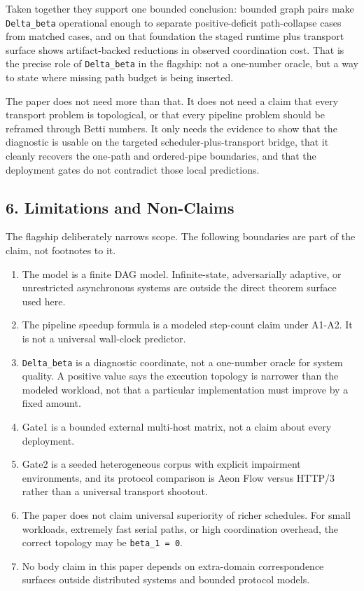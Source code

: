 \documentclass[
  11pt,
]{article}
\providecommand{\tightlist}{%
  \setlength{\itemsep}{0pt}\setlength{\parskip}{0pt}}
\begin{document}
Taken together they support one bounded conclusion: bounded graph pairs
make \texttt{Delta\_beta} operational enough to separate
positive-deficit path-collapse cases from matched cases, and on that
foundation the staged runtime plus transport surface shows
artifact-backed reductions in observed coordination cost. That is the
precise role of \texttt{Delta\_beta} in the flagship: not a one-number
oracle, but a way to state where missing path budget is being inserted.

The paper does not need more than that. It does not need a claim that
every transport problem is topological, or that every pipeline problem
should be reframed through Betti numbers. It only needs the evidence to
show that the diagnostic is usable on the targeted
scheduler-plus-transport bridge, that it cleanly recovers the one-path
and ordered-pipe boundaries, and that the deployment gates do not
contradict those local predictions.

\subsection{6. Limitations and
Non-Claims}\label{limitations-and-non-claims}

The flagship deliberately narrows scope. The following boundaries are
part of the claim, not footnotes to it.

\begin{enumerate}
\def\labelenumi{\arabic{enumi}.}
\tightlist
\item
  The model is a finite DAG model. Infinite-state, adversarially
  adaptive, or unrestricted asynchronous systems are outside the direct
  theorem surface used here.
\item
  The pipeline speedup formula is a modeled step-count claim under
  A1-A2. It is not a universal wall-clock predictor.
\item
  \texttt{Delta\_beta} is a diagnostic coordinate, not a one-number
  oracle for system quality. A positive value says the execution
  topology is narrower than the modeled workload, not that a particular
  implementation must improve by a fixed amount.
\item
  Gate1 is a bounded external multi-host matrix, not a claim about every
  deployment.
\item
  Gate2 is a seeded heterogeneous corpus with explicit impairment
  environments, and its protocol comparison is Aeon Flow versus HTTP/3
  rather than a universal transport shootout.
\item
  The paper does not claim universal superiority of richer schedules.
  For small workloads, extremely fast serial paths, or high coordination
  overhead, the correct topology may be \texttt{beta\_1\ =\ 0}.
\item
  No body claim in this paper depends on extra-domain correspondence
  surfaces outside distributed systems and bounded protocol models.
\end{enumerate}
\end{document}
